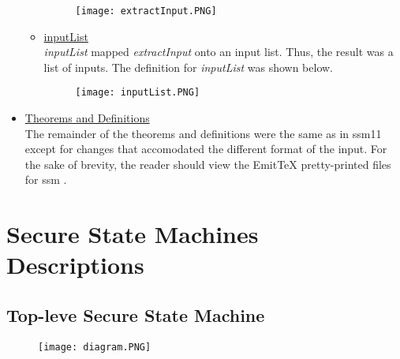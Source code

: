 \begin{itemize}
\begin{itemize}
\begin{figure}[h]
  \centering
  \texttt{[image: extractInput.PNG]}
\end{figure}
\item \underline{inputList}\\
  \textit{inputList} mapped \textit{extractInput} onto an input list.  Thus, the result was a list of inputs.
  The definition for \textit{inputList} was shown below.
  \begin{figure}[h!]
  \centering
  \texttt{[image: inputList.PNG]}
\end{figure}
\end{itemize}
\item \underline{Theorems and Definitions}\\
  The remainder of the theorems and definitions were the same as in ssm11 except for changes that
  accomodated the different format of the input.  For the sake of brevity, the reader should view
  the EmitTeX pretty-printed files for ssm .
  \end{itemize}

\chapter{Secure State Machines Descriptions}
\label{cha:secure-state-mach}

\section{Top-leve Secure State Machine}
\label{sec:top-leve-secure}

\begin{figure}[h]
  \centering
  \texttt{[image: diagram.PNG]}
\end{figure}









